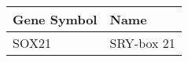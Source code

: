 \begin{tabular}{ll}
\toprule
Gene Symbol &       Name \\
\midrule
      SOX21 & SRY-box 21 \\
\bottomrule
\end{tabular}

